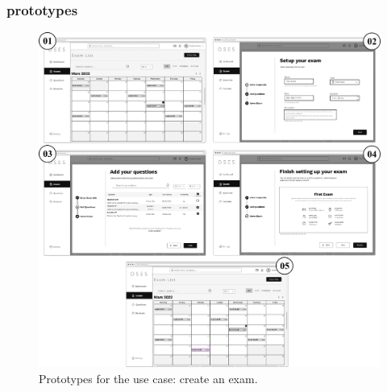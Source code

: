 \documentclass[]{uc2pfecaneva}
\begin{document}
    \subsubsection{prototypes}
    \begin{figure}[h]

        \centering
        \includegraphics[width=\textwidth]{images/prototypes_create_exam}

        \caption{Prototypes for the use case: create an exam.}
    \end{figure}
    \clearpage
\end{document}
